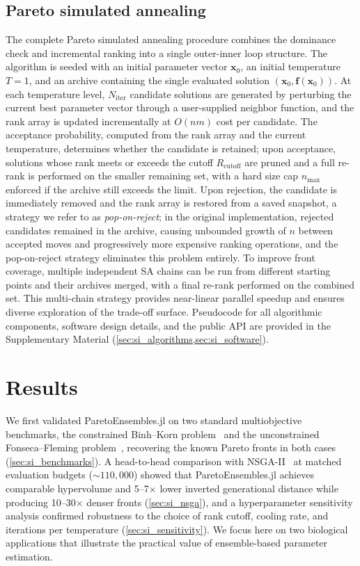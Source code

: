 \documentclass[preprint,review,12pt]{elsarticle}
\begin{document}
\subsection{Pareto simulated annealing}\label{sec:annealing}
The complete Pareto simulated annealing procedure combines the dominance check and incremental ranking into a single outer-inner loop structure.
The algorithm is seeded with an initial parameter vector $\mathbf{x}_0$, an initial temperature $T = 1$, and an archive containing the single evaluated solution $(\mathbf{x}_0, \mathbf{f}(\mathbf{x}_0))$.
At each temperature level, $N_{\text{iter}}$ candidate solutions are generated by perturbing the current best parameter vector through a user-supplied neighbor function, and the rank array is updated incrementally at $O(nm)$ cost per candidate.
The acceptance probability, computed from the rank array and the current temperature, determines whether the candidate is retained; upon acceptance, solutions whose rank meets or exceeds the cutoff $R_{\text{cutoff}}$ are pruned and a full re-rank is performed on the smaller remaining set, with a hard size cap $n_{\max}$ enforced if the archive still exceeds the limit.
Upon rejection, the candidate is immediately removed and the rank array is restored from a saved snapshot, a strategy we refer to as \emph{pop-on-reject}; in the original implementation, rejected candidates remained in the archive, causing unbounded growth of $n$ between accepted moves and progressively more expensive ranking operations, and the pop-on-reject strategy eliminates this problem entirely.
To improve front coverage, multiple independent SA chains can be run from different starting points and their archives merged, with a final re-rank performed on the combined set.
This multi-chain strategy provides near-linear parallel speedup and ensures diverse exploration of the trade-off surface.
Pseudocode for all algorithmic components, software design details, and the public API are provided in the Supplementary Material (\cref{sec:si_algorithms,sec:si_software}).

\section{Results}\label{sec:results}
We first validated ParetoEnsembles.jl on two standard multiobjective benchmarks, the constrained Binh--Korn problem~\cite{Binh1997} and the unconstrained Fonseca--Fleming problem~\cite{Fonseca1995}, recovering the known Pareto fronts in both cases (\cref{sec:si_benchmarks}).
A head-to-head comparison with NSGA-II~\cite{Deb2002} at matched evaluation budgets (${\sim}110{,}000$) showed that ParetoEnsembles.jl achieves comparable hypervolume and 5--7$\times$ lower inverted generational distance while producing 10--30$\times$ denser fronts (\cref{sec:si_nsga}), and a hyperparameter sensitivity analysis confirmed robustness to the choice of rank cutoff, cooling rate, and iterations per temperature (\cref{sec:si_sensitivity}).
We focus here on two biological applications that illustrate the practical value of ensemble-based parameter estimation.
\end{document}
